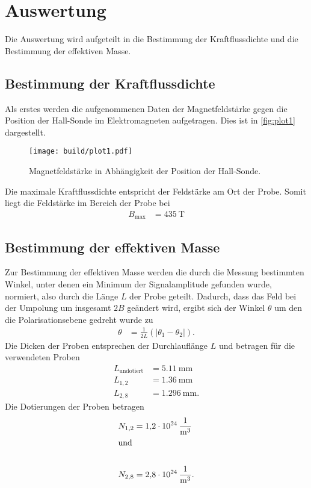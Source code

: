 \section{Auswertung}
\label{sec:Auswertung}
Die Auswertung wird aufgeteilt
in die Bestimmung der Kraftflussdichte und die Bestimmung der effektiven Masse.

\subsection{Bestimmung der Kraftflussdichte}
\label{sub:Kraftflussdichte}

Als erstes werden die aufgenommenen Daten der Magnetfeldstärke gegen die Position der Hall-Sonde im Elektromagneten aufgetragen.
Dies ist in \autoref{fig:plot1} dargestellt.
\begin{figure}[H]
  \centering
  \texttt{[image: build/plot1.pdf]}
  \caption {Magnetfeldstärke in Abhängigkeit der Position der Hall-Sonde.}
  \label{fig:plot1}
\end{figure}


Die maximale Kraftflussdichte entspricht der Feldstärke am Ort der Probe.
Somit liegt die Feldstärke im Bereich der Probe bei 
\begin{align*}
  B_\text{max} &= \qty{435}{\tesla}
\end{align*}

\subsection{Bestimmung der effektiven Masse}
\label{sub:effektiveMasse}

Zur Bestimmung der effektiven Masse werden die durch die Messung bestimmten Winkel, unter denen ein Minimum der Signalamplitude gefunden wurde,
normiert, also durch die Länge $L$ der Probe geteilt.
Dadurch, dass das Feld bei der Umpolung um insgesamt $\num{2}B$ geändert wird, ergibt sich der Winkel $\theta$ um den die Polarisationsebene
gedreht wurde zu
\begin{align}
  \theta &= \frac{1}{2L}(\lvert \theta_1-\theta_2 \rvert).
\end{align}
Die Dicken der Proben entsprechen der Durchlauflänge $L$ und betragen für die verwendeten Proben
\begin{align*}
  L_{\text{undotiert}}&= \qty{5.11}{\milli\meter}\\
  L_{1,2}&= \qty{1.36}{\milli\meter}\\
  L_{2,8}&= \qty{1.296}{\milli\meter}.
\end{align*}
Die Dotierungen der Proben betragen
\begin{align*}
  N_{1,2}&= \qty{1.2 e24}{\per\cubic\meter}\\
  \shortintertext{und}\\
  N_{2,8}&= \qty{2.8 e24}{\per\cubic\meter}.
\end{align*}

